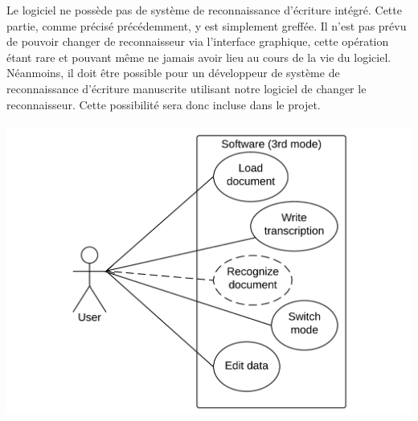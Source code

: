 Le logiciel ne possède pas de système de reconnaissance d’écriture intégré. Cette partie, comme précisé précédemment, y est simplement greffée. Il n’est pas prévu de pouvoir changer de reconnaisseur via l’interface graphique, cette opération étant rare et pouvant même ne jamais avoir lieu au cours de la vie du logiciel. Néanmoins, il  doit être possible pour un développeur de système de reconnaissance d’écriture manuscrite utilisant notre logiciel de changer le reconnaisseur. Cette possibilité sera donc incluse dans le projet.

\paragraph{}

\begin{mdframed}[frametitle={Figure 5 : Diagramme de cas d'utilisation (pour développeur)}, innerbottommargin=10]
\begin{center}
\includegraphics[width=\linewidth]{Usecase_3.pdf}
\end{center}
\end{mdframed}

\paragraph{}









